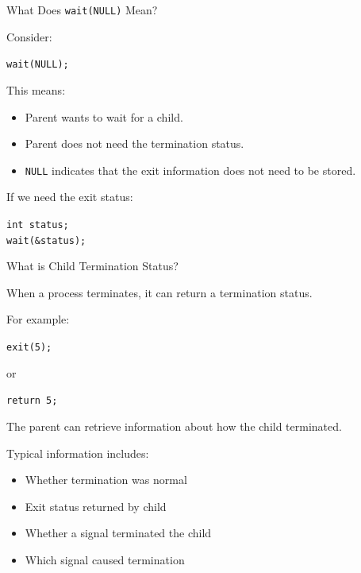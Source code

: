\documentclass[aspectratio=169]{beamer}
\begin{document}
\begin{frame}{What Does \texttt{wait(NULL)} Mean?}

Consider:

\begin{center}
\texttt{wait(NULL);}
\end{center}

This means:

\begin{itemize}

    \item Parent wants to wait for a child.

    \item Parent does not need the termination status.

    \item \texttt{NULL} indicates that the exit information does not need to be
    stored.

\end{itemize}

If we need the exit status:

\begin{center}
\texttt{int status;}\\[0.2cm]
\texttt{wait(\&status);}
\end{center}

\end{frame}

\begin{frame}{What is Child Termination Status?}

When a process terminates, it can return a termination status.

For example:

\begin{center}
\texttt{exit(5);}
\end{center}

or

\begin{center}
\texttt{return 5;}
\end{center}

The parent can retrieve information about how the child terminated.

Typical information includes:

\begin{itemize}

    \item Whether termination was normal

    \item Exit status returned by child

    \item Whether a signal terminated the child

    \item Which signal caused termination

\end{itemize}

\end{frame}
\end{document}
